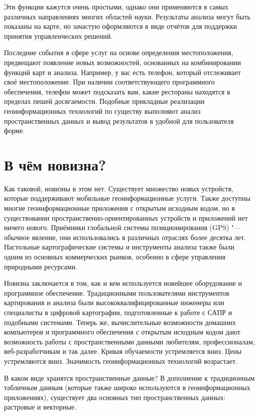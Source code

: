 Эти функции кажутся очень простыми, однако они применяются в самых
различных направлениях многих областей науки. Результаты анализа могут
быть показаны на карте, но зачастую оформляются в виде отчётов для
поддержки принятия управленческих решений.

Последние события в сфере услуг на основе определения местоположения,
предвещают появление новых возможностей, основанных на комбинировании
функций карт и анализа. Например, у вас есть телефон, который
отслеживает своё местоположение. При наличии соответствующего
программного обеспечения, телефон может подсказать вам, какие
рестораны находятся в пределах пешей досягаемости. Подобные
прикладные реализации геоинформационных технологий по существу выполняют
анализ пространственных данных и вывод результатов в удобной для пользователя
форме.

\section{В чём новизна?}\label{label_whynew}

Как таковой, новизны в этом нет. Существует множество новых устройств, которые
поддерживают мобильные геоинформационные услуги. Также доступны многие
геоинформационные приложения с открытым исходным кодом, но в
существовании пространственно-ориентированных устройств и приложений нет
ничего нового. Приёмники глобальной системы позиционирования (GPS) "--- обычное
явление, они использовались в различных отраслях более десятка лет.
Настольные картографические системы и инструменты анализа также были одним из
основных коммерческих рынков, особенно в сфере управления природными ресурсами.

Новизна заключается в том, как и кем используется новейшее оборудование и
программное обеспечение. Традиционными пользователями инструментов
картирования и анализа были высококвалифицированные инженеры или
специалисты в цифровой картографии, подготовленные к работе с
САПР и подобными системами. Теперь же, вычислительные возможности
домашних компьютеров и программного обеспечения с открытым исходным
кодом дают возможность работы с пространственными данными любителям, профессионалам,
веб-разработчикам и так далее. Кривая обучаемости устремляется вниз. Цены
устремляются вниз. Значимость геоинформационных технологий возрастает.

В каком виде хранятся пространственные данные? В дополнение к традиционным
табличным данным (которые также широко используются в геоинформационных
приложениях), существует два основных тип пространственных данных: растровые и
векторные.

